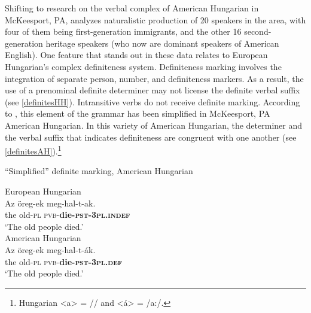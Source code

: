 \documentclass[output=paper,colorlinks,citecolor=brown,footheight=42pt]{langscibook}
\begin{document}
Shifting to research on the verbal complex of American Hungarian in McKeesport, PA, \citet{fenyvesi2000affectedness} analyzes naturalistic production of 20 speakers in the area, with four of them being first-generation immigrants, and the other 16 second-generation heritage speakers (who now are dominant speakers of American English). One feature that stands out in these data relates to European Hungarian's complex definiteness system. Definiteness marking involves the integration of separate person, number, and definiteness markers. As a result, the use of a prenominal definite determiner may not license the definite verbal suffix (see \ref{definitesHH}). Intransitive verbs do not receive definite marking. According to \citet{fenyvesi2000affectedness}, this element of the grammar has been simplified in McKeesport, PA American Hungarian. In this variety of American Hungarian, the determiner and the verbal suffix that indicates definiteness are congruent with one another  (see \ref{definitesAH}).\footnote{Hungarian <a> = /\textturnscripta/ and <á> = /a:/.}  

\begin{exe}
\ex “Simplified” definite marking, American Hungarian  \citep[97]{fenyvesi2000affectedness} 
\begin{xlist}
\ex\label{definitesHH} European Hungarian \\
\gll Az \"{o}reg-ek meg-hal-t-ak.\\
the old-\textsc{pl} \textsc{pvb}-\textbf{die-\textsc{pst-3pl.indef}}\\
\glt `The old people died.'\\
\ex\label{definitesAH} American Hungarian \\
\gll Az \"{o}reg-ek meg-hal-t-ák.\\
the old-\textsc{pl} \textsc{pvb}-\textbf{die-\textsc{pst-3pl.def}}\\
\glt `The old people died.'\\
\end{xlist}
\end{exe}
\end{document}
